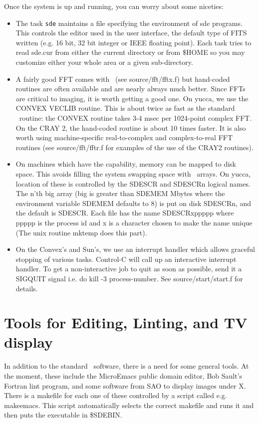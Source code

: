 Once the system is up and running, you can worry about some niceties:
\begin{itemize}
\item The task {\tt sde} maintains a file specifying the environment of sde
programs. This controls the editor used in the user interface, the
default type of FITS written (e.g. 16 bit, 32 bit integer or IEEE floating
point). Each task tries to read sde.cur from either the current
directory or from \$HOME so you may customize either your whole area
or a given sub-directory.
\item A fairly good FFT comes with \sde\ (see source/fft/fftx.f) but
hand-coded routines are often available and are nearly always much
better.  Since FFTs are critical to imaging, it is worth getting a
good one. On yucca, we use the CONVEX VECLIB routine. This is about
twice as fast as the standard \sde\ routine: the CONVEX routine takes
3-4 msec per 1024-point complex FFT.  On the CRAY 2, the hand-coded
routine is about 10 times faster. It is also worth using
machine-specific real-to-complex and complex-to-real FFT routines (see
source/fft/fftr.f for examples of the use of the CRAY2 routines).
\item On machines which have the capability, memory can be mapped to disk
space. This avoids filling the system swapping space with \sde\ arrays.
On yucca, location of these is controlled by the SDESCR and SDESCRn
logical names.  The n'th big array (big is greater than SDEMEM Mbytes
where the environment variable SDEMEM defaults to 8) is put on disk
SDESCRn, and the default is SDESCR.  Each file has the name
SDESCRxppppp where ppppp is the process id and x is a character chosen
to make the name unique (The unix routine mktemp does this part).
\item On the Convex's and Sun's, we use an interrupt handler which allows
graceful stopping of various tasks. Control-C will call up an
interactive interrupt handler. To get a non-interactive job to quit as
soon as possible, send it a SIGQUIT signal i.e. do kill -3
process-number.  See source/start/start.f for details.
\end{itemize}

\newpage
\section{Tools for Editing, Linting, and TV display}

In addition to the standard \sde\ software, there is a need for some
general tools. At the moment, these include the MicroEmacs public
domain editor, Bob Sault's Fortran lint program, and some software
from SAO to display images under X. There is a makefile for each one
of these controlled by a script called e.g. makeemacs.  This script
automatically selects the correct makefile and runs it and then puts
the executable in \$SDEBIN.

